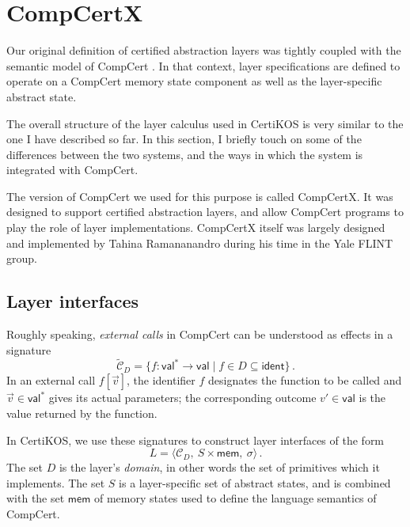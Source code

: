 \documentclass[11pt,oneside,draft]{book}
\theoremstyle{definition}
\newcommand{\kw}[1]{\ensuremath{ \mathsf{#1} }}
\begin{document}


\section{CompCertX} \label{sec:cal:compcertx} %

Our original definition of certified abstraction layers
was tightly coupled with the semantic model of CompCert
\citep{popl15}.
In that context,
layer specifications are defined to operate
on a CompCert memory state component as well as
the layer-specific abstract state.

The overall structure of
the layer calculus used in CertiKOS is very similar
to the one I have described so far.
In this section,
I briefly touch on some of the differences between the two systems,
and the ways in which the system is integrated with CompCert.

The version of CompCert we used for this purpose
is called CompCertX.
It was designed to support certified abstraction layers,
and allow CompCert programs
to play the role of layer implementations.
CompCertX itself was largely designed and implemented
by Tahina Ramananandro
during his time in the Yale FLINT group.

\subsection{Layer interfaces} %

Roughly speaking,
\emph{external calls} in CompCert
can be understood as effects in a signature
\[
  \tilde{\mathcal{C}}_D =
  \{ f : \kw{val}^* \rightarrow \kw{val} \mid
    f \in D \subseteq \kw{ident} \}
  \,.
\]
In an external call $f[\vec{v}]$,
the identifier $f$ designates the function to be called
and $\vec{v} \in \kw{val}^*$ gives its actual parameters;
the corresponding outcome $v' \in \kw{val}$
is the value returned by the function.

In CertiKOS,
we use these signatures
to construct layer interfaces of the form
\[
  L =
  \langle \mathcal{C}_D, \: S \times \kw{mem}, \: \sigma \rangle
  \,.
\]
The set $D$ is the layer's \emph{domain},
in other words the set of primitives which it implements.
The set $S$ is a layer-specific set of abstract states,
and is combined with the set $\kw{mem}$ of memory states
used to define the language semantics of CompCert.
\end{document}
